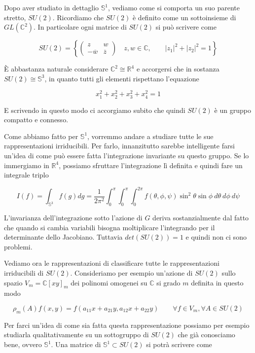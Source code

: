 \documentclass[11pt]{article}
\theoremstyle{plain}
\theoremstyle{definition}
\theoremstyle{remark}
\newcommand{\C}{\mathbb{C}}
\newcommand{\R}{\mathbb{R}}
\newcommand{\dint}{\displaystyle\int}
\begin{document}
Dopo aver studiato in dettaglio $\mathbb{S}^1$, vediamo come si comporta un suo parente stretto, $SU(2)$. Ricordiamo che $SU(2)$ è definito come un sottoinsieme di $GL(\C^2)$. In particolare ogni matrice di $SU(2)$ si può scrivere come 

 \[ SU(2) = \left\{  \left(\begin{array}{cc} z & w \\ -\overline{w} & \overline z \end{array}\right) \quad z, w \in \C  , \qquad |z_1|^2 + |z_2|^2 = 1\right\} \]

 È abbastanza naturale considerare $\C^2 \cong \R^4$ e accorgersi che in sostanza $SU(2) \cong \mathbb{S}^3$, in quanto tutti gli elementi rispettano l'equazione

 \[ x_1 ^2 + x_2^2 + x_3^2 + x_4^2 = 1 \]

 E scrivendo in questo modo ci accorgiamo subito che quindi $SU(2)$ è un gruppo compatto e connesso.

 Come abbiamo fatto per $\mathbb{S}^1$, vorremmo andare a studiare tutte le sue rappresentazioni irriducibili. Per farlo, innanzitutto sarebbe intelligente farsi un'idea di come può essere fatta l'integrazione invariante su questo gruppo. Se lo immergiamo in $\R^4$, possiamo sfruttare l'integrazione lì definita e quindi fare un integrale triplo

 \[ I(f) = \dint_{\mathbb{S}^3} f(g) dg = \dfrac{1}{2\pi^2} \dint_0^\pi \dint_0^{\pi} \dint_0 ^{2\pi} f(\theta, \phi, \psi) \sin^2\theta\sin\phi \ d\theta \ d\phi \ d\psi\]


 L'invarianza dell'integrazione sotto l'azione di $G$ deriva sostanzialmente dal fatto che quando si cambia variabili bisogna moltiplicare l'integrando per il determinante dello Jacobiano. Tuttavia $det(SU(2)) = 1$ e quindi non ci sono problemi.


 Vediamo ora le rappresentazioni di classificare tutte le rappresentazioni irriducibili di $SU(2)$. Consideriamo per esempio un'azione di $SU(2)$ sullo spazio $V_m = \C[xy]_m$ dei polinomi omogenei su $\C$ si grado $m$ definita in questo modo 

 \[
 \rho_m(A) f(x, y) = f(a_{11} x + a_{21} y , a_{12} x + a_{22} y) \qquad \forall f \in V_m, \forall A \in SU(2)
 \]



 Per farci un'idea di come sia fatta questa rappresentazione possiamo per esempio studiarla qualitativamente su un sottogruppo di $SU(2)$ che già conosciamo bene, ovvero $\mathbb{S}^1$. Una matrice di $\mathbb{S}^1 \subset SU(2)$ si potrà scrivere come
\end{document}
